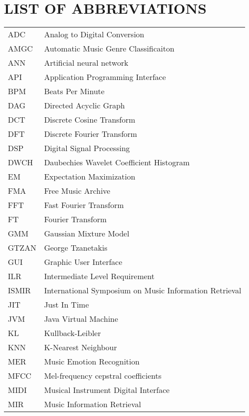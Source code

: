 \newpage
\section*{\fontsize{14pt}{0pt}\bfseries LIST OF ABBREVIATIONS}
\begin{longtable}[l]{p{50pt} p{200pt}}
        ADC & Analog to Digital Conversion\\
        AMGC & Automatic Music Genre Classificaiton\\
        ANN & Artificial neural network\\
        API & Application Programming Interface\\
        BPM & Beats Per Minute\\
        DAG & Directed Acyclic Graph\\
        DCT & Discrete Cosine Transform\\
        DFT & Discrete Fourier Transform\\
        DSP & Digital Signal Processing\\
        DWCH & Daubechies Wavelet Coefficient Histogram\\
        EM & Expectation Maximization\\
        FMA & Free Music Archive\\
        FFT & Fast Fourier Transform\\
        FT & Fourier Transform\\
        GMM & Gaussian Mixture Model\\
        GTZAN & George Tzanetakis\\
        GUI & Graphic User Interface\\
        ILR & Intermediate Level Requirement\\
        ISMIR & International Symposium on Music Information Retrieval\\
        JIT & Just In Time\\
        JVM & Java Virtual Machine\\
        KL & Kullback-Leibler\\
        KNN & K-Nearest Neighbour\\
        MER & Music Emotion Recognition\\
        MFCC & Mel-frequency cepstral coefficients\\
        MIDI & Musical Instrument Digital Interface\\
        MIR & Music Information Retrieval  \\

\end{longtable}
